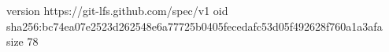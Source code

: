 version https://git-lfs.github.com/spec/v1
oid sha256:bc74ea07e2523d262548e6a77725b0405fecedafc53d05f492628f760a1a3afa
size 78
